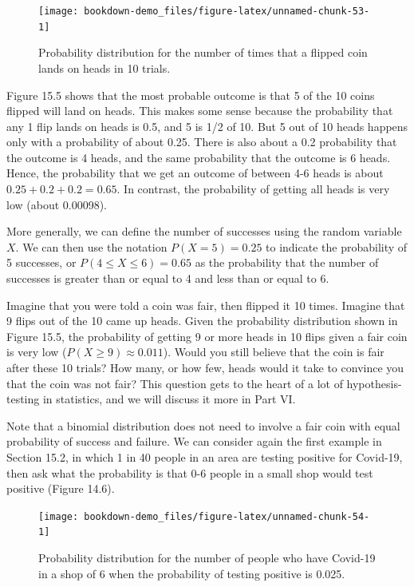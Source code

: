 \documentclass[
  openany]{scrbook}
\begin{document}
\begin{figure}
\texttt{[image: bookdown-demo\_files/figure-latex/unnamed-chunk-53-1]} \caption{Probability distribution for the number of times that a flipped coin lands on heads in 10 trials.}\label{fig:unnamed-chunk-53}
\end{figure}

Figure 15.5 shows that the most probable outcome is that 5 of the 10 coins flipped will land on heads.
This makes some sense because the probability that any 1 flip lands on heads is 0.5, and 5 is 1/2 of 10.
But 5 out of 10 heads happens only with a probability of about 0.25.
There is also about a 0.2 probability that the outcome is 4 heads, and the same probability that the outcome is 6 heads.
Hence, the probability that we get an outcome of between 4-6 heads is about \(0.25 + 0.2 + 0.2 = 0.65\).
In contrast, the probability of getting all heads is very low (about 0.00098).

More generally, we can define the number of successes using the random variable \(X\).
We can then use the notation \(P(X = 5) = 0.25\) to indicate the probability of 5 successes, or \(P(4 \leq X \leq 6) = 0.65\) as the probability that the number of successes is greater than or equal to 4 and less than or equal to 6.

Imagine that you were told a coin was fair, then flipped it 10 times.
Imagine that 9 flips out of the 10 came up heads.
Given the probability distribution shown in Figure 15.5, the probability of getting 9 or more heads in 10 flips given a fair coin is very low (\(P(X \geq 9) \approx 0.011\)).
Would you still believe that the coin is fair after these 10 trials?
How many, or how few, heads would it take to convince you that the coin was not fair?
This question gets to the heart of a lot of hypothesis-testing in statistics, and we will discuss it more in Part VI.

Note that a binomial distribution does not need to involve a fair coin with equal probability of success and failure.
We can consider again the first example in Section 15.2, in which 1 in 40 people in an area are testing positive for Covid-19, then ask what the probability is that 0-6 people in a small shop would test positive (Figure 14.6).

\begin{figure}
\texttt{[image: bookdown-demo\_files/figure-latex/unnamed-chunk-54-1]} \caption{Probability distribution for the number of people who have Covid-19 in a shop of 6 when the probability of testing positive is 0.025.}\label{fig:unnamed-chunk-54}
\end{figure}
\end{document}
